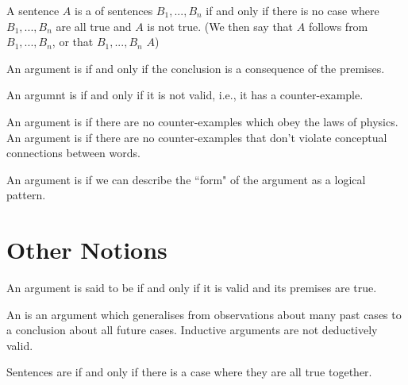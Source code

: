 \documentclass[12pt, a4paper, oneside, openright, titlepage]{book}
\begin{document}
\begin{defn}[Consequence]{}
    A sentence $A$ is a  of sentences $B_1,...,B_n$ if and only if there is no case where $B_1,...,B_n$ are all true and $A$ is not true. (We then say that $A$ follows from $B_1,...,B_n$, or that $B_1,...,B_n$  $A$)
\end{defn}


\begin{defn}{}
    An argument is  if and only if the conclusion is a consequence of the premises.
\end{defn}

\begin{defn}{}
    An argumnt is  if and only if it is not valid, i.e., it has a counter-example.
\end{defn}


\begin{rmk}
    An argument is  if there are no counter-examples which obey the laws of physics. An argument is  if there are no counter-examples that don't violate conceptual connections between words.
\end{rmk}


\begin{rmk}
    An argument is  if we can describe the ``form" of the argument as a logical pattern.
\end{rmk}

\section{\textsection Other Notions}

\begin{defn}
    An argument is said to be  if and only if it is valid and its premises are true.
\end{defn}


\begin{defn}
    An  is an argument which generalises from observations about many past cases to a conclusion about all future cases. Inductive arguments are not deductively valid.
\end{defn}

\begin{defn}{}
    Sentences are  if and only if there is a case where they are all true together.
\end{defn}
\end{document}
